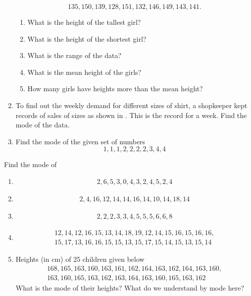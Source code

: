 \begin{enumerate}[label=\thesubsection.\arabic*, ref=\thesubsection.\theenumi]
	$$135, 150, 139, 128, 151, 132, 146, 149, 143, 141.$$
	\begin{enumerate}
		\item What is the height of the tallest girl?
		\item What is the height of the shortest girl?
		\item What is the range of the data?
		\item What is the mean height of the girls?
		\item How many girls have heights more than the mean height?
	\end{enumerate}
\item To find out the weekly demand for different sizes of shirt, a shopkeeper kept records of sales of sizes as shown in 
.  This is the record for a week.  Find the mode of the data.
	\begin{table}[H]
  \centering
  
  \caption{}
  \label{tab:shirt}
\end{table}
\item Find the mode of the given set of numbers
	$$1,1,1,2,2,2,2,3,4,4$$
\end{enumerate}
Find the mode of
\begin{enumerate}[label=\thesubsection.\arabic*, ref=\thesubsection.\theenumi,resume*]
\item 	
		\begin{gather*}
		2,6,5,3,0,4,3,2,4,5,2,4
	\end{gather*}
\item 
		\begin{gather*}
		2,4,16,12,14,14,16,14,10,14,18,14
	\end{gather*}
	\item 
		\begin{gather*}
		2,2,2,3,3,4,5,5,5,6,6,8
	\end{gather*}
	\item 
		\begin{gather*}
		12, 14, 12, 16, 15, 13, 14, 18, 19, 12, 14, 15, 16, 15, 16, 16,
	\\
		15, 17, 13, 16, 16, 15, 15, 13, 15, 17, 15, 14, 15, 13, 15, 14
		\end{gather*}
	\item Heights (in cm) of 25 children given below
		\begin{gather*}
		168, 165, 163, 160, 163, 161, 162, 164, 163, 162,
164, 163,	160, 
		\\
	 163, 160, 165, 163, 162, 163, 164, 163, 160, 165, 163, 162 
	\end{gather*}
		What is the mode of their heights? What do we understand by mode here?
\end{enumerate}
